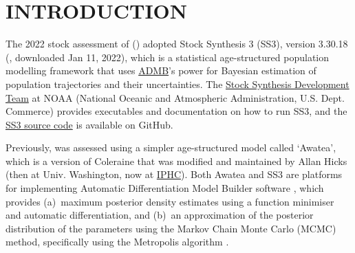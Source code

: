 \documentclass[11pt]{book}
\begin{document}
\newcommand{\LH}{}%
\newcommand{\RH}{}%
\newcommand{\LF}{\spn{} 2022}
\newcommand{\RF}{APPENDIX~\thechapter ~-- Model Equations}

\lhead{\LH}\rhead{\RH}\lfoot{\LF}\rfoot{\RF}

\newcommand{\nSims}{8,000\,(for base)\,/ 4,000\,(for sensitivities)}
\newcommand{\nChains}{8}
\newcommand{\cSims}{1,000\,(base)\,/ 500\,(sens)}
\newcommand{\cBurn}{750\,(base)\,/ 250\,(sens)}
\newcommand{\cSamps}{250}
\newcommand{\Nmcmc}{2,000}
\newcommand{\Nbase}{2,000}

\newcommand{\harvestMax}{0.401}
\newcommand{\harvestInc}{0.001}
\newcommand{\policyMax}{2000}
\newcommand{\policyInc}{250}
\newcommand{\currYear}{2023} %
\newcommand{\prevYear}{2022} %
\newcommand{\projYear}{2033} %

\section{INTRODUCTION}%

The 2022 stock assessment of \spn{} (\spc) adopted Stock Synthesis 3 (SS3), version 3.30.18 (\citealt{Methot-etal:2021}, downloaded Jan 11, 2022), which is a statistical age-structured population modelling framework \citep{Methot-Wetzel:2013} that uses \href{https://www.admb-project.org/}{ADMB}'s power for Bayesian estimation of population trajectories and their uncertainties.
The \href{https://vlab.noaa.gov/web/stock-synthesis}{Stock Synthesis Development Team} at NOAA (National Oceanic and Atmospheric Administration, U.S. Dept. Commerce) provides executables and documentation on how to run SS3, and the \href{https://github.com/nmfs-stock-synthesis/stock-synthesis}{SS3 source code} is available on GitHub.

Previously, \spc{} was assessed using a simpler age-structured model called `Awatea', which is a version of Coleraine \citep{Hilborn-etal:2003} that was modified and maintained by Allan Hicks (then at Univ. Washington, now at \href{https://www.iphc.int/}{IPHC}).
Both Awatea and SS3 are platforms for implementing Automatic Differentiation Model Builder software \citep{ADMB:2009}, which provides (a)~maximum posterior density estimates using a function minimiser and automatic differentiation, and (b)~an approximation of the posterior distribution of the parameters using the Markov Chain Monte Carlo (MCMC) method, specifically using the Metropolis algorithm \citep{Gelman-etal:2004}.
\end{document}
